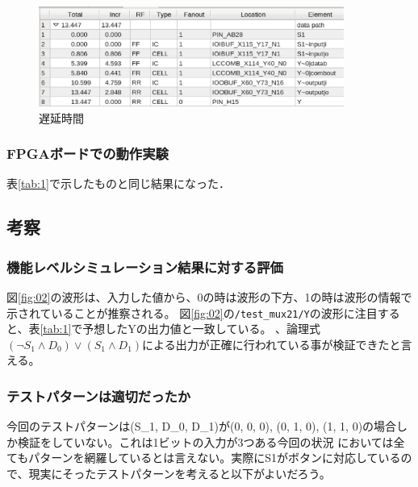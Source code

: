 \documentclass[uplatex]{jsarticle}
\begin{document}
\begin{figure}[htb]
  \begin{center}
    \includegraphics[width=10cm]{images/fig05.eps}
    \caption{遅延時間}
    \label{fig:05}
  \end{center}
\end{figure}

\subsubsection{FPGAボードでの動作実験}

表\ref{tab:1}で示したものと同じ結果になった．

\clearpage

\subsection{考察}

\subsubsection{機能レベルシミュレーション結果に対する評価}

図\ref{fig:02}の波形は、入力した値から、0の時は波形の下方、1の時は波形の情報で示されていることが推察される。
図\ref{fig:02}の{\tt /test\_mux21/Y}の波形に注目すると、表\ref{tab:1}で予想したYの出力値と一致している。
、論理式$(\lnot S_1 \land D_0) \lor (S_1 \land D_1)$による出力が正確に行われている事が検証できたと言える。

\subsubsection{テストパターンは適切だったか}

今回のテストパターンは(S_1, D_0, D_1)が(0, 0, 0), (0, 1, 0), (1, 1, 0)の場合しか検証をしていない。これは1ビットの入力が3つある今回の状況
においては全てもパターンを網羅しているとは言えない。実際にS1がボタンに対応しているので、現実にそったテストパターンを考えると以下がよいだろう。
\end{document}
